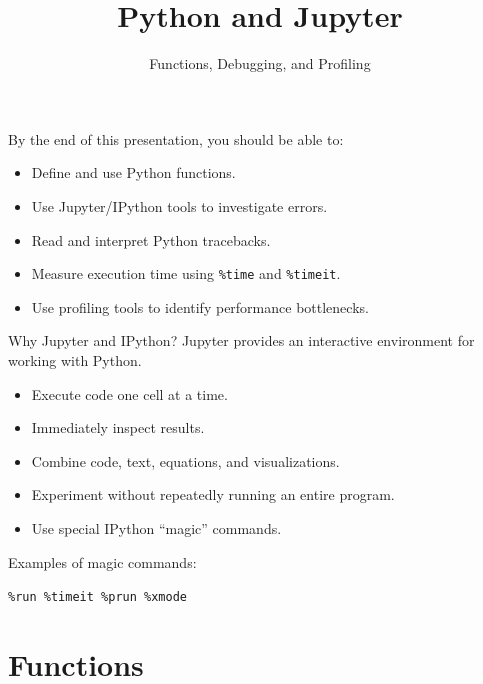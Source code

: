 \documentclass[aspectratio=169]{beamer}
\title{Python and Jupyter}
\subtitle{Functions, Debugging, and Profiling}
\author{}
\date{\color{aggiemaroon}{
DAEN 300\\
\textbf{Alexander Abuabara}\\
Fall 2026
}}
\begin{document}
\begin{frame}
    \titlepage
\end{frame}

\begin{frame}{} %
By the end of this presentation, you should be able to:
\begin{itemize}
    \item Define and use Python functions.
    \item Use Jupyter/IPython tools to investigate errors.
    \item Read and interpret Python tracebacks.
    \item Measure execution time using \texttt{\%time} and \texttt{\%timeit}.
    \item Use profiling tools to identify performance bottlenecks.
\end{itemize}
\end{frame}

\begin{frame}{Why Jupyter and IPython?}
Jupyter provides an interactive environment for working with Python.

\begin{itemize}
    \item Execute code one cell at a time.
    \item Immediately inspect results.
    \item Combine code, text, equations, and visualizations.
    \item Experiment without repeatedly running an entire program.
    \item Use special IPython ``magic'' commands.
\end{itemize}

\vspace{0.3cm}

Examples of magic commands:
\begin{center}
\texttt{\%run \qquad \%timeit \qquad \%prun \qquad \%xmode}
\end{center}
\end{frame}

\section{Functions}
\end{document}

